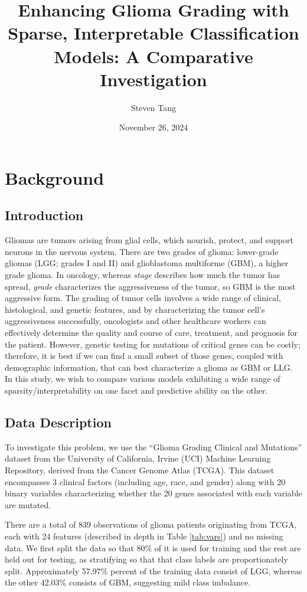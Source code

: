 \documentclass[12pt]{article}
\title{Enhancing Glioma Grading with Sparse, Interpretable Classification Models: A Comparative Investigation}
\author{Steven Tang}
\date{November 26, 2024\\}
\newtheorem{Proof of Lemma}{Proof of Lemma}
\begin{document}
\maketitle


\section{Background}
\subsection{Introduction}

Gliomas are tumors arising from glial cells, which nourish, protect, and support neurons in the nervous system. 
There are two grades of glioma: lower-grade gliomas (LGG; grades I and II) and glioblastoma multiforme (GBM), 
a higher grade glioma. In oncology, whereas \textit{stage} describes how much the tumor has spread, \textit{grade} characterizes 
the aggressiveness of the tumor, so GBM is the most aggressive form. The grading of tumor cells involves a wide
range of clinical, histological, and genetic features, and by characterizing the tumor cell’s aggressiveness successfully, 
oncologists and other healthcare workers can effectively determine the quality and course of care, treatment, and prognosis for the 
patient. However, genetic testing for mutations of critical genes can be costly; therefore, it is best if we can find 
a small subset of those genes, coupled with demographic information, that can best characterize a glioma as GBM or LLG. 
In this study, we wish to compare various models exhibiting a wide range of sparsity/interpretability on one facet and predictive 
ability on the other.

\subsection{Data Description}

To investigate this problem, we use the ``Glioma Grading Clinical and Mutations'' dataset from the University 
of California, Irvine (UCI) Machine Learning Repository, derived from the Cancer Genome Atlas (TCGA). 
This dataset encompasses 3 clinical factors (including age, race, and gender) along with 20 binary variables characterizing 
whether the 20 genes associated with each variable are mutated.

There are a total of 839 observations of glioma patients originating from TCGA, 
each with 24 features (described in depth in Table \ref{tab:vars}) and no missing data. We 
first split the data so that 80\% of it is used for training and the rest are held out for testing, as
stratifying so that that class labels are proportionately split. Approximately 57.97\% percent of the 
training data consist of LGG, whereas the other 42.03\% consists of GBM, suggesting mild class imbalance.
\end{document}
